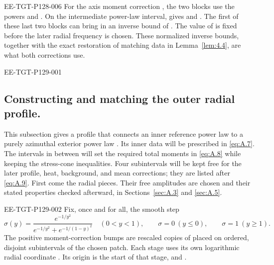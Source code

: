 \begin{EESegment}{EE-TGT-P128-006}
For the axis moment correction , the two blocks use
the powers  and
. On the intermediate power-law interval,
 gives
 and
. The first of these last two
blocks can bring in an inverse bound of . The value of
 is fixed before the later radial frequency is chosen. These
normalized inverse bounds, together with the exact restoration of matching data in
Lemma~\ref{lem:4.4}, are what both corrections use.
\end{EESegment}

%
\begin{EESegment}{EE-TGT-P129-001}
\subsection{Constructing and matching the outer radial profile.}\label{sec:A.2}
This subsection gives a profile that connects an inner reference power law to a purely
azimuthal exterior power law . Its inner data will
be prescribed in \eqref{eq:A.7}. The intervals in between will set the required total
moments in \eqref{eq:A.8} while keeping the stress-cone inequalities. Four subintervals
will be kept free for the later profile, heat, background, and mean corrections; they are
listed after \eqref{eq:A.9}. First come the radial pieces. Their free amplitudes are chosen
and their stated properties checked afterward, in Sections~\ref{sec:A.3} and
\ref{sec:A.5}.
\end{EESegment}

\begin{EESegment}{EE-TGT-P129-002}
Fix, once and for all, the smooth step
\begin{equation}
\sigma(y)=\frac{e^{-1/y^2}}{e^{-1/y^2}+e^{-1/(1-y)^2}}
\quad(0<y<1),
\qquad \sigma=0\ (y\le0),
\qquad \sigma=1\ (y\ge1).
\tag{A.5}\label{eq:A.5}
\end{equation}
The positive moment-correction bumps are rescaled copies of
 placed on ordered, disjoint subintervals of the chosen
patch. Each stage uses its own logarithmic radial coordinate
. Its origin is the start of that stage, and
.
\end{EESegment}

